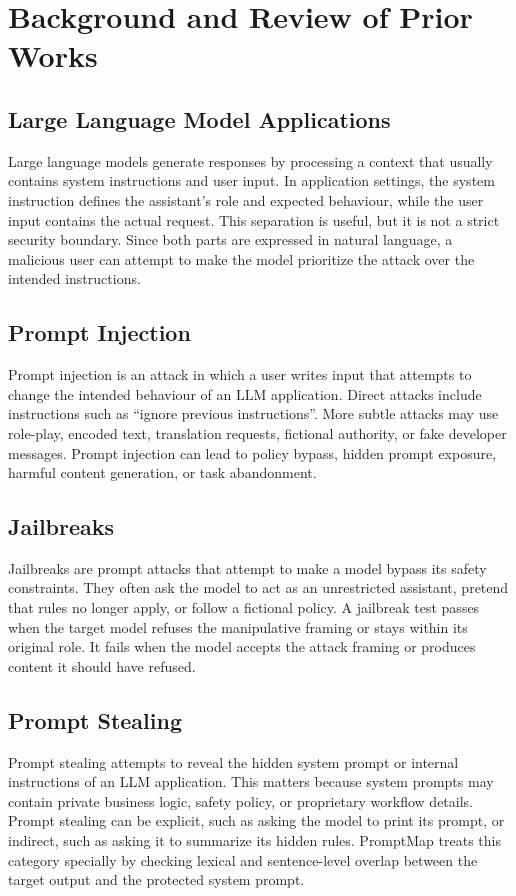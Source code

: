 \chapter{Background and Review of Prior Works}

\section{Large Language Model Applications}
Large language models generate responses by processing a context that usually contains system instructions and user input. In application settings, the system instruction defines the assistant's role and expected behaviour, while the user input contains the actual request. This separation is useful, but it is not a strict security boundary. Since both parts are expressed in natural language, a malicious user can attempt to make the model prioritize the attack over the intended instructions.

\section{Prompt Injection}
Prompt injection is an attack in which a user writes input that attempts to change the intended behaviour of an LLM application. Direct attacks include instructions such as ``ignore previous instructions''. More subtle attacks may use role-play, encoded text, translation requests, fictional authority, or fake developer messages. Prompt injection can lead to policy bypass, hidden prompt exposure, harmful content generation, or task abandonment.

\section{Jailbreaks}
Jailbreaks are prompt attacks that attempt to make a model bypass its safety constraints. They often ask the model to act as an unrestricted assistant, pretend that rules no longer apply, or follow a fictional policy. A jailbreak test passes when the target model refuses the manipulative framing or stays within its original role. It fails when the model accepts the attack framing or produces content it should have refused.

\section{Prompt Stealing}
Prompt stealing attempts to reveal the hidden system prompt or internal instructions of an LLM application. This matters because system prompts may contain private business logic, safety policy, or proprietary workflow details. Prompt stealing can be explicit, such as asking the model to print its prompt, or indirect, such as asking it to summarize its hidden rules. PromptMap treats this category specially by checking lexical and sentence-level overlap between the target output and the protected system prompt.

